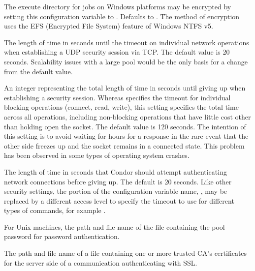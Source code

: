 \begin{description}
\label{param:EncryptExecuteDirectory}
\item[\Macro{ENCRYPT\_EXECUTE\_DIRECTORY}]
  The execute directory for jobs on Windows platforms may be
  encrypted by setting this configuration variable to .
  Defaults to .
  The method of encryption uses the EFS (Encrypted File System)
  feature of Windows NTFS v5.

\label{param:SecTCPSessionTimeout}
\item[\Macro{SEC\_TCP\_SESSION\_TIMEOUT}]
  The length of time in seconds until the timeout
  on individual network operations when establishing a UDP security
  session via TCP.
  The default value is 20 seconds.
  Scalability issues with a large pool would be the only basis
  for a change from the default value.

\label{param:SecTCPSessionDeadline}
\item[\Macro{SEC\_TCP\_SESSION\_DEADLINE}]
  An integer representing the total length of time in seconds until giving up
  when establishing a security session.  Whereas
   specifies the timeout
  for individual blocking operations (connect, read, write), this
  setting specifies the total time across all operations, including
  non-blocking operations that have little cost other than holding
  open the socket.
  The default value is 120 seconds.
  The intention of this setting is to avoid waiting for hours
  for a response in the rare event that the other side
  freezes up and the socket remains in a connected state.
  This problem has been observed in some types of operating system
  crashes.

\label{param:SecDefaultAuthenticationTimeout}
\item[\Macro{SEC\_DEFAULT\_AUTHENTICATION\_TIMEOUT}]
  The length of time in seconds that Condor should attempt
  authenticating network connections before giving up.
  The default is 20 seconds.
  Like other security settings, the portion of the configuration variable
  name, , 
  may be replaced by a different access level to specify the timeout to use for
  different types of commands, for example
  .

\label{param:SecPasswordFile}
\item[\Macro{SEC\_PASSWORD\_FILE}]
  For Unix machines, the path and file name
  of  the file containing the pool password for password authentication.


\label{param:AuthSSLServerCAFile}
\item[\Macro{AUTH\_SSL\_SERVER\_CAFILE}]
  The path and file name of
  a file containing one or more trusted CA's certificates
  for the server side of a communication authenticating 
  with SSL.


\end{description}
